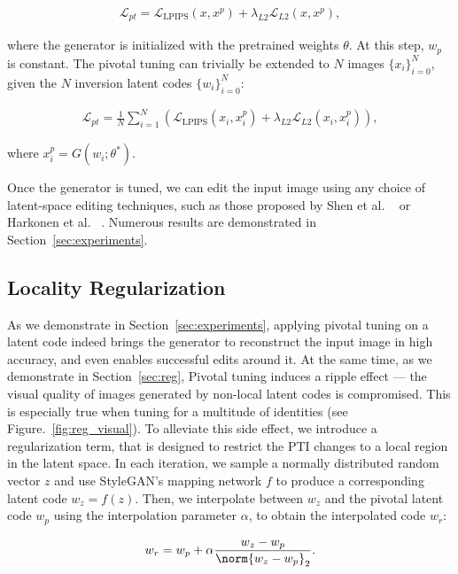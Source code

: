 \begin{align}
\mathcal{L}_{pt} =  \mathcal{L}_{\text{LPIPS}}(x, x^{p}) + \lambda_{L2}\mathcal{L}_{L2}(x, x^{p}),
\end{align}

where the generator is initialized with the pretrained weights $\theta$. At this step, $w_p$ is constant. The pivotal tuning can trivially be extended to $N$ images $\{x_i\}_{i=0}^{N}$, given the $N$ inversion latent codes $\{w_i\}_{i=0}^{N}$:

\begin{align}
\mathcal{L}_{pt} = \frac{1}{N}\sum^{N}_{i=1} ( \mathcal{L}_{\text{LPIPS}}(x_i, x^{p}_i) + \lambda_{L2}\mathcal{L}_{L2}(x_i, x^{p}_i)), 
\end{align}

where $x^{p}_i = G(w_i; \theta^*)$.

Once the generator is tuned, we can edit the input image using any choice of latent-space editing techniques, such as those proposed by Shen et al. ~\cite{shen2020interpreting} or Harkonen et al. ~\cite{harkonen2020ganspace}. Numerous results are demonstrated in Section~\ref{sec:experiments}. 

\subsection{Locality Regularization}

As we demonstrate in Section~\ref{sec:experiments}, applying pivotal tuning on a latent code indeed brings the generator to reconstruct the input image in high accuracy, and even enables successful edits around it. At the same time, as we demonstrate in Section~\ref{sec:reg}, Pivotal tuning induces a ripple effect --- the visual quality of images generated by non-local latent codes is compromised. This is especially true when tuning for a multitude of identities (see Figure.~\ref{fig:reg_visual}).   
To alleviate this side effect, we introduce a regularization term, that is designed to restrict the PTI changes to a local region in the latent space. In each iteration, we sample a normally distributed random vector $z$ and use StyleGAN's mapping network $f$ to produce a corresponding latent code $w_z = f(z)$. Then, we interpolate between $w_z$ and the pivotal latent code $w_p$ using the interpolation parameter $\alpha$, to obtain the interpolated code $w_r$:

\begin{align}
w_r = w_p + \alpha\frac{w_z - w_p}{\norm{w_z - w_p}_2}.
\end{align}

